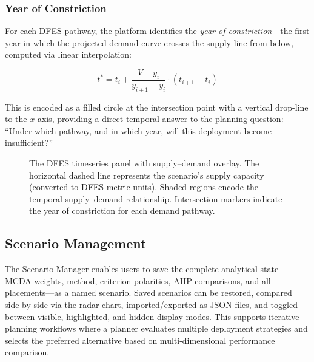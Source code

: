 \subsubsection{Year of Constriction}

For each DFES pathway, the platform identifies the \emph{year of constriction}---the first year in which the projected demand curve crosses the supply line from below, computed via linear interpolation:

\begin{equation}
\label{eq:constriction}
t^{*} = t_i + \frac{V - y_i}{y_{i+1} - y_i} \cdot (t_{i+1} - t_i)
\end{equation}

\noindent This is encoded as a filled circle at the intersection point with a vertical drop-line to the $x$-axis, providing a direct temporal answer to the planning question: ``Under which pathway, and in which year, will this deployment become insufficient?''

\begin{figure}[htbp]
    \centering
    \caption{The DFES timeseries panel with supply--demand overlay. The horizontal dashed line represents the scenario's supply capacity (converted to DFES metric units). Shaded regions encode the temporal supply--demand relationship. Intersection markers indicate the year of constriction for each demand pathway.}
    \label{fig:dfes-overlay}
\end{figure}

\subsection{Scenario Management}
\label{sec:scenario-mgmt}

The Scenario Manager enables users to save the complete analytical state---MCDA weights, method, criterion polarities, AHP comparisons, and all placements---as a named scenario. Saved scenarios can be restored, compared side-by-side via the radar chart, imported/exported as JSON files, and toggled between visible, highlighted, and hidden display modes. This supports iterative planning workflows where a planner evaluates multiple deployment strategies and selects the preferred alternative based on multi-dimensional performance comparison.

